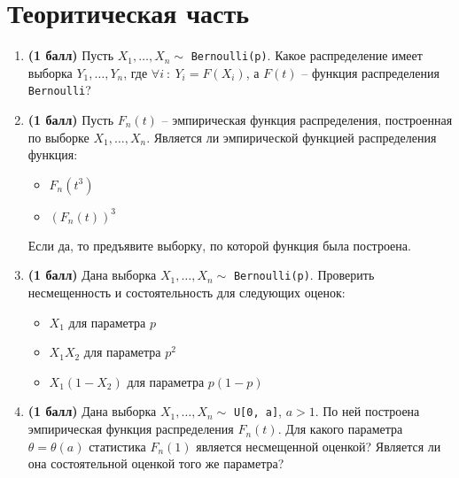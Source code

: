 \documentclass{assignment}
\begin{document}

\section*{Теоритическая часть}
\begin{enumerate}
    \item \textbf{(1 балл)} Пусть $X_1, \ldots, X_n \sim $ \texttt{Bernoulli(p)}. Какое распределение имеет выборка $Y_1, \ldots, Y_n$, где $\forall i~:~Y_i = F(X_i)$, а $F(t)$ -- функция распределения \texttt{Bernoulli}?

    \item \textbf{(1 балл)} Пусть $F_n(t)$ -- эмпирическая функция распределения, построенная по выборке $X_1, \ldots, X_n$. Является ли эмпирической функцией распределения функция:
    \begin{itemize}
        \item $F_n(t^3)$
        \item $(F_n(t))^3$
    \end{itemize}
    Если да, то предъявите выборку, по которой функция была построена.

    \item \textbf{(1 балл)} Дана выборка $X_1, \ldots, X_n \sim $ \texttt{Bernoulli(p)}. Проверить несмещенность и состоятельность для следующих оценок:
    \begin{itemize}
        \item $X_1$ для параметра $p$
        \item $X_1X_2$ для параметра $p^2$
        \item $X_1(1 - X_2)$ для параметра $p(1 - p)$
    \end{itemize}

    \item \textbf{(1 балл)} Дана выборка $X_1, \ldots, X_n \sim $ \texttt{U[0, a]}, $a > 1$. По ней построена эмпирическая функция распределения $F_n(t)$. Для какого параметра $\theta = \theta(a)$ статистика $F_n(1)$ является несмещенной оценкой? Является ли она состоятельной оценкой того же параметра?
\end{enumerate}

\newpage
\end{document}
